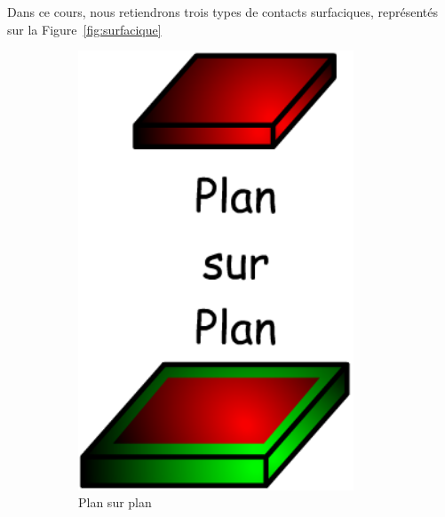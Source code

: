 \documentclass[10pt,fleqn,draft]{article} %
\begin{document}
Dans ce cours, nous retiendrons trois types de contacts surfaciques, représentés sur la Figure~\ref{fig:surfacique}

\begin{figure}[h]
  \begin{subfigure}[b]{0.3\textwidth}
    \centering
    \includegraphics[width=0.9\textwidth,height=.15\textheight,keepaspectratio]{images/surface_plan}
    \caption{Plan sur plan}
  \end{subfigure}\hfill
  \begin{subfigure}[b]{0.3\textwidth}
    \centering

\end{subfigure}
\end{figure}
\end{document}
